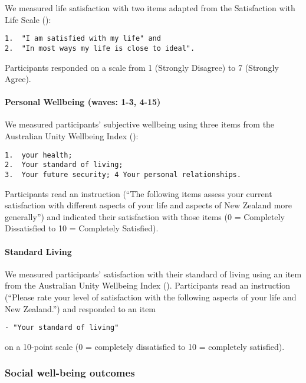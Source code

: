 \documentclass[
  singlecolumn,
  9pt]{article}
\let\oldparagraph\paragraph
\renewcommand{\paragraph}[1]{\oldparagraph{#1}\mbox{}}
\begin{document}
We measured life satisfaction with two items adapted from the
Satisfaction with Life Scale ():

\begin{verbatim}
1.  "I am satisfied with my life" and
2.  "In most ways my life is close to ideal".
\end{verbatim}

Participants responded on a scale from 1 (Strongly Disagree) to 7
(Strongly Agree).

\paragraph{Personal Wellbeing (waves: 1-3,
4-15)}\label{personal-wellbeing-waves-1-3-4-15}

We measured participants' subjective wellbeing using three items from
the Australian Unity Wellbeing Index
():

\begin{verbatim}
1.  your health;
2.  Your standard of living;
3.  Your future security; 4 Your personal relationships.
\end{verbatim}

Participants read an instruction (``The following items assess your
current satisfaction with different aspects of your life and aspects of
New Zealand more generally'') and indicated their satisfaction with
those items (0 = Completely Dissatisfied to 10 = Completely Satisfied).

\paragraph{Standard Living}\label{standard-living}

We measured participants' satisfaction with their standard of living
using an item from the Australian Unity Wellbeing Index
().
Participants read an instruction (``Please rate your level of
satisfaction with the following aspects of your life and New Zealand.'')
and responded to an item

\begin{verbatim}
- "Your standard of living"
\end{verbatim}

on a 10-point scale (0 = completely dissatisfied to 10 = completely
satisfied).

\subsubsection{Social well-being
outcomes}\label{social-well-being-outcomes}
\end{document}
